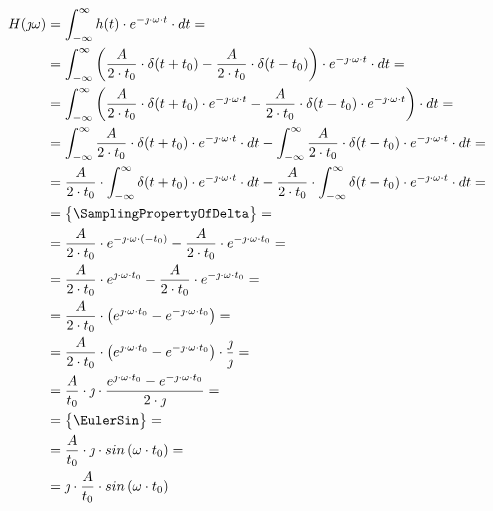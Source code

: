 \begin{task}
\begin{align*}
H(\jmath \omega )&=\int_{-\infty }^{\infty}h(t) \cdot e^{-\jmath \cdot \omega \cdot t}\cdot dt=\\
&=\int_{-\infty }^{\infty}\left( \frac{A}{2\cdot t_0} \cdot \delta(t+t_0) - \frac{A}{2\cdot t_0} \cdot \delta(t-t_0) \right) \cdot e^{-\jmath \cdot \omega \cdot t}\cdot dt=\\
&=\int_{-\infty }^{\infty}\left( \frac{A}{2\cdot t_0} \cdot \delta(t+t_0)\cdot e^{-\jmath \cdot \omega \cdot t} - \frac{A}{2\cdot t_0} \cdot \delta(t-t_0)\cdot e^{-\jmath \cdot \omega \cdot t} \right) \cdot dt=\\
&=\int_{-\infty }^{\infty} \frac{A}{2\cdot t_0} \cdot \delta(t+t_0)\cdot e^{-\jmath \cdot \omega \cdot t}\cdot dt - \int_{-\infty }^{\infty} \frac{A}{2\cdot t_0} \cdot \delta(t-t_0)\cdot e^{-\jmath \cdot \omega \cdot t} \cdot dt=\\
&= \frac{A}{2\cdot t_0} \cdot \int_{-\infty }^{\infty} \delta(t+t_0)\cdot e^{-\jmath \cdot \omega \cdot t}\cdot dt - \frac{A}{2\cdot t_0} \cdot \int_{-\infty }^{\infty}  \delta(t-t_0)\cdot e^{-\jmath \cdot \omega \cdot t} \cdot dt=\\
&=\begin{Bmatrix}
\SamplingPropertyOfDelta
\end{Bmatrix}=\\
&= \frac{A}{2\cdot t_0} \cdot e^{-\jmath \cdot \omega \cdot (-t_0)} - \frac{A}{2\cdot t_0} \cdot e^{-\jmath \cdot \omega \cdot t_0}=\\
&= \frac{A}{2\cdot t_0} \cdot e^{\jmath \cdot \omega \cdot t_0} - \frac{A}{2\cdot t_0} \cdot e^{-\jmath \cdot \omega \cdot t_0}=\\
&= \frac{A}{2\cdot t_0} \cdot \left(e^{\jmath \cdot \omega \cdot t_0} - e^{-\jmath \cdot \omega \cdot t_0}\right)=\\
&= \frac{A}{2\cdot t_0} \cdot \left(e^{\jmath \cdot \omega \cdot t_0} - e^{-\jmath \cdot \omega \cdot t_0}\right) \cdot \frac{\jmath}{\jmath}=\\
&= \frac{A}{t_0} \cdot \jmath \cdot \frac{e^{\jmath \cdot \omega \cdot t_0} - e^{-\jmath \cdot \omega \cdot t_0}}{2\cdot \jmath}=\\
&=\begin{Bmatrix}
\EulerSin
\end{Bmatrix}=\\
&= \frac{A}{t_0} \cdot \jmath \cdot sin\left( \omega \cdot t_0\right)=\\
&= \jmath \cdot \frac{A}{t_0} \cdot sin\left( \omega \cdot t_0\right)
\end{align*}


\end{task}
